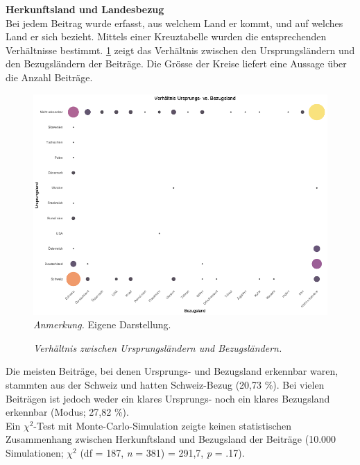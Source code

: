 \documentclass[12pt,a4paper]{article}        %
\begin{document}
\textbf{Herkunftsland und Landesbezug}\\
Bei jedem Beitrag wurde erfasst, aus welchem Land er kommt, und auf welches Land er sich bezieht. Mittels einer Kreuztabelle wurden die entsprechenden Verhältnisse bestimmt. \ref{fig:results_country_relation} zeigt das Verhältnis zwischen den Ursprungsländern und den Bezugsländern der Beiträge. Die Grösse der Kreise liefert eine Aussage über die Anzahl Beiträge.
\begin{figure}[H]
  \caption{\textit{Verhältnis zwischen Ursprungsländern und Bezugsländern.}}
  \label{fig:results_country_relation}
  \centering
  \includegraphics[width=1\linewidth]{images/country_relation_plot.png}
\footnotesize\textit{Anmerkung.} Eigene Darstellung.
\end{figure}

Die meisten Beiträge, bei denen Ursprungs- und Bezugsland erkennbar waren, stammten aus der Schweiz und hatten Schweiz-Bezug (20,73 \%). Bei vielen Beiträgen ist jedoch weder ein klares Ursprungs- noch ein klares Bezugsland erkennbar (Modus; 27,82 \%).\\
Ein \(\chi^2\)-Test mit Monte-Carlo-Simulation zeigte keinen statistischen Zusammenhang zwischen Herkunftsland und Bezugsland der Beiträge (10.000 Simulationen; \(\chi^2\) (df = 187, \textit{n} = 381) = 291,7,  \textit{p} = .17).
\end{document}
